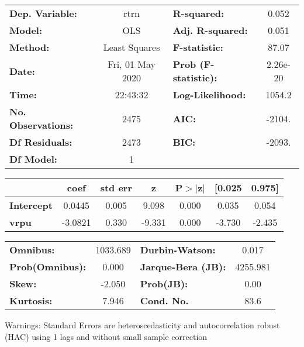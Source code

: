 \begin{center}
\begin{tabular}{lclc}
\toprule
\textbf{Dep. Variable:}    &       rtrn       & \textbf{  R-squared:         } &     0.052   \\
\textbf{Model:}            &       OLS        & \textbf{  Adj. R-squared:    } &     0.051   \\
\textbf{Method:}           &  Least Squares   & \textbf{  F-statistic:       } &     87.07   \\
\textbf{Date:}             & Fri, 01 May 2020 & \textbf{  Prob (F-statistic):} &  2.26e-20   \\
\textbf{Time:}             &     22:43:32     & \textbf{  Log-Likelihood:    } &    1054.2   \\
\textbf{No. Observations:} &        2475      & \textbf{  AIC:               } &    -2104.   \\
\textbf{Df Residuals:}     &        2473      & \textbf{  BIC:               } &    -2093.   \\
\textbf{Df Model:}         &           1      & \textbf{                     } &             \\
\bottomrule
\end{tabular}
\begin{tabular}{lcccccc}
                   & \textbf{coef} & \textbf{std err} & \textbf{z} & \textbf{P$> |$z$|$} & \textbf{[0.025} & \textbf{0.975]}  \\
\midrule
\textbf{Intercept} &       0.0445  &        0.005     &     9.098  &         0.000        &        0.035    &        0.054     \\
\textbf{vrpu}      &      -3.0821  &        0.330     &    -9.331  &         0.000        &       -3.730    &       -2.435     \\
\bottomrule
\end{tabular}
\begin{tabular}{lclc}
\textbf{Omnibus:}       & 1033.689 & \textbf{  Durbin-Watson:     } &    0.017  \\
\textbf{Prob(Omnibus):} &   0.000  & \textbf{  Jarque-Bera (JB):  } & 4255.981  \\
\textbf{Skew:}          &  -2.050  & \textbf{  Prob(JB):          } &     0.00  \\
\textbf{Kurtosis:}      &   7.946  & \textbf{  Cond. No.          } &     83.6  \\
\bottomrule
\end{tabular}
\end{center}

Warnings: \newline
 [1] Standard Errors are heteroscedasticity and autocorrelation robust (HAC) using 1 lags and without small sample correction